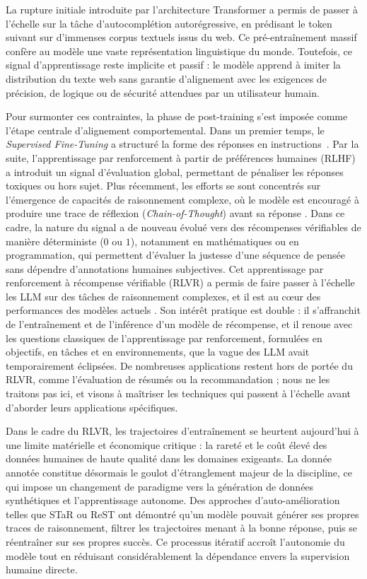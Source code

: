 \documentclass[11pt,a4paper]{article}
\begin{document}
La rupture initiale introduite par l'architecture Transformer \cite{vaswani2017attention} a permis de passer à l'échelle sur la tâche d'autocomplétion autorégressive, en prédisant le token suivant sur d'immenses corpus textuels issus du web. Ce pré-entraînement massif confère au modèle une vaste représentation linguistique du monde. Toutefois, ce signal d'apprentissage reste implicite et passif : le modèle apprend à imiter la distribution du texte web sans garantie d'alignement avec les exigences de précision, de logique ou de sécurité attendues par un utilisateur humain.

Pour surmonter ces contraintes, la phase de post-training s'est imposée comme l'étape centrale d'alignement comportemental. Dans un premier temps, le \emph{Supervised Fine-Tuning} a structuré la forme des réponses en instructions~\cite{wei2022flan}. Par la suite, l'apprentissage par renforcement à partir de préférences humaines (RLHF) \cite{ouyang2022training} a introduit un signal d'évaluation global, permettant de pénaliser les réponses toxiques ou hors sujet. Plus récemment, les efforts se sont concentrés sur l'émergence de capacités de raisonnement complexe, où le modèle est encouragé à produire une trace de réflexion (\emph{Chain-of-Thought}) avant sa réponse \cite{wei2022cot}. Dans ce cadre, la nature du signal a de nouveau évolué vers des récompenses vérifiables de manière déterministe ($0$ ou $1$), notamment en mathématiques ou en programmation, qui permettent d'évaluer la justesse d'une séquence de pensée sans dépendre d'annotations humaines subjectives. Cet apprentissage par renforcement à récompense vérifiable (RLVR) a permis de faire passer à l'échelle les LLM sur des tâches de raisonnement complexes, et il est au cœur des performances des modèles actuels \cite{openai_o1_2024, deepseekr1_2025}. Son intérêt pratique est double : il s'affranchit de l'entraînement et de l'inférence d'un modèle de récompense, et il renoue avec les questions classiques de l'apprentissage par renforcement, formulées en objectifs, en tâches et en environnements, que la vague des LLM avait temporairement éclipsées. De nombreuses applications restent hors de portée du RLVR, comme l'évaluation de résumés ou la recommandation ; nous ne les traitons pas ici, et visons à maîtriser les techniques qui passent à l'échelle avant d'aborder leurs applications spécifiques.

Dans le cadre du RLVR, les trajectoires d'entraînement se heurtent aujourd'hui à une limite matérielle et économique critique : la rareté et le coût élevé des données humaines de haute qualité dans les domaines exigeants. La donnée annotée constitue désormais le goulot d'étranglement majeur de la discipline, ce qui impose un changement de paradigme vers la génération de données synthétiques et l'apprentissage autonome. Des approches d'auto-amélioration telles que STaR \cite{zelikman2022star} ou ReST \cite{singh2024beyond} ont démontré qu'un modèle pouvait générer ses propres traces de raisonnement, filtrer les trajectoires menant à la bonne réponse, puis se réentraîner sur ses propres succès. Ce processus itératif accroît l'autonomie du modèle tout en réduisant considérablement la dépendance envers la supervision humaine directe.
\end{document}
